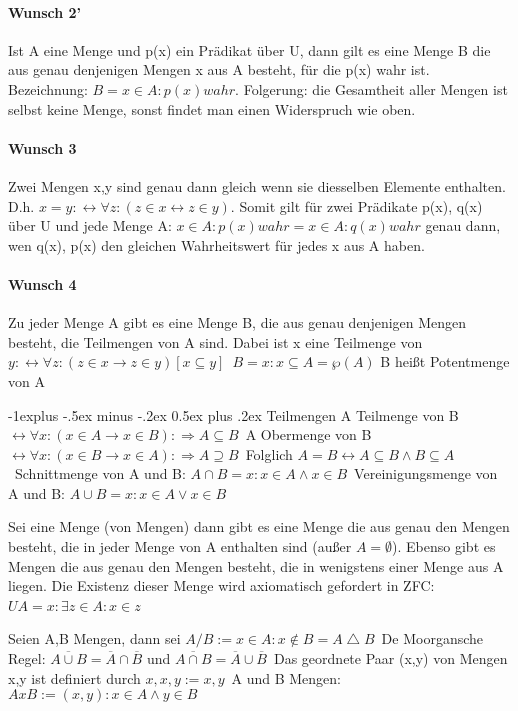 \documentclass[10pt,landscape]{article}
\makeatletter
\renewcommand{\subsection}{\@startsection{subsection}{2}{0mm}%
                                {-1explus -.5ex minus -.2ex}%
                                {0.5ex plus .2ex}%
                                {\normalfont\normalsize\bfseries}}
\makeatother
\begin{document}
\begin{multicols}{3}
\paragraph{Wunsch 2'}
Ist A eine Menge und p(x) ein Prädikat über U, dann gilt es eine Menge B die aus genau denjenigen Mengen x aus A besteht, für die p(x) wahr ist. Bezeichnung: $B={x\in A:p(x) wahr}$.
Folgerung: die Gesamtheit aller Mengen ist selbst keine Menge, sonst findet man einen Widerspruch wie oben.

\paragraph{Wunsch 3}
Zwei Mengen x,y sind genau dann gleich wenn sie diesselben Elemente enthalten. D.h. $x=y: \leftrightarrow \forall z:(z\in x \leftrightarrow z\in y)$. Somit gilt für zwei Prädikate p(x), q(x) über U und jede Menge A: ${x\in A: p(x) wahr} = {x\in A: q(x) wahr}$ genau dann, wen q(x), p(x) den gleichen Wahrheitswert für jedes x aus A haben.

\paragraph{Wunsch 4}
Zu jeder Menge A gibt es eine Menge B, die aus genau denjenigen Mengen besteht, die Teilmengen von A sind. Dabei ist x eine Teilmenge von $y: \leftrightarrow \forall z:(z\in x \rightarrow z \in y) [x \subseteq y]$\
$B={x:x\subseteq A}=\wp(A)$ B heißt Potentmenge von A\

\subsection{Teilmengen}
A Teilmenge von B $\leftrightarrow \forall x: (x\in A \rightarrow x \in B):\Rightarrow A\subseteq B$\
A Obermenge von B $\leftrightarrow \forall x: (x\in B \rightarrow x \in A):\Rightarrow A\supseteq B$\
Folglich $A=B \leftrightarrow A\subseteq B \wedge B\subseteq A$\
Schnittmenge von A und B: $A\cap B = {x: x\in A \wedge x\in B}$\
Vereinigungsmenge von A und B: $A\cup B = {x: x\in A \vee x\in B}$

Sei eine Menge (von Mengen) dann gibt es eine Menge die aus genau den Mengen besteht, die in jeder Menge von A enthalten sind (außer $A=\emptyset$).
Ebenso gibt es Mengen die aus genau den Mengen besteht, die in wenigstens einer Menge aus A liegen. Die Existenz dieser Menge wird axiomatisch gefordert in ZFC:$ UA = {x: \exists z \in A: x \in z}$\

Seien A,B Mengen, dann sei $A/B:={x\in A: x\not \in B } = A\bigtriangleup B$\
De Moorgansche Regel: $\overline{A \cup B} = \overline{A} \cap \overline{B}$ und $\overline{A\cap B}=\overline{A}\cup \overline{B}$\
Das geordnete Paar (x,y) von Mengen x,y ist definiert durch ${{x},{x,y}}:={x,y}$\
A und B Mengen: $A x B:={(x,y):x\in A \wedge y \in B}$


\end{multicols}
\end{document}
